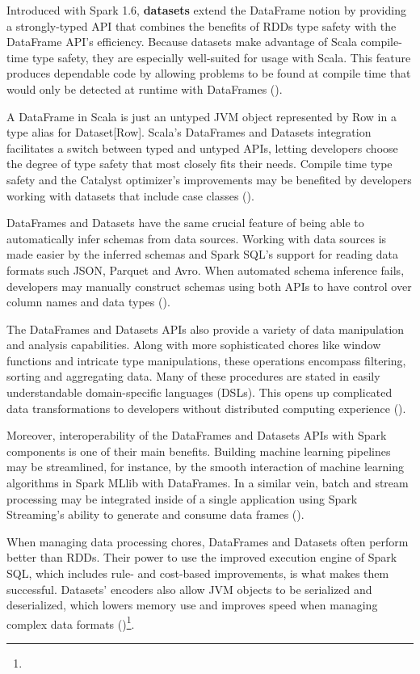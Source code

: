 Introduced with Spark 1.6, \textbf{datasets} extend the DataFrame notion by providing a strongly-typed API that combines the benefits of RDDs type safety with the DataFrame API's efficiency. Because datasets make advantage of Scala compile-time type safety, they are especially well-suited for usage with Scala. This feature produces dependable code by allowing problems to be found at compile time that would only be detected at runtime with DataFrames (\cite{Chambers2018SparkTD})\footnotemark[35].

A DataFrame in Scala is just an untyped JVM object represented by Row in a type alias for Dataset[Row]. Scala's DataFrames and Datasets integration facilitates a switch between typed and untyped APIs, letting developers choose the degree of type safety that most closely fits their needs. Compile time type safety and the Catalyst optimizer's improvements may be benefited by developers working with datasets that include case classes (\cite{Chambers2018SparkTD})\footnotemark[35].

DataFrames and Datasets have the same crucial feature of being able to automatically infer schemas from data sources. Working with data sources is made easier by the inferred schemas and Spark SQL's support for reading data formats such JSON, Parquet and Avro. When automated schema inference fails, developers may manually construct schemas using both APIs to have control over column names and data types (\cite{Chambers2018SparkTD})\footnotemark[35].

The DataFrames and Datasets APIs also provide a variety of data manipulation and analysis capabilities. Along with more sophisticated chores like window functions and intricate type manipulations, these operations encompass filtering, sorting and aggregating data. Many of these procedures are stated in easily understandable domain-specific languages (DSLs). This opens up complicated data transformations to developers without distributed computing experience (\cite{Chambers2018SparkTD})\footnotemark[35].

Moreover, interoperability of the DataFrames and Datasets APIs with Spark components is one of their main benefits. Building machine learning pipelines may be streamlined, for instance, by the smooth interaction of machine learning algorithms in Spark MLlib with DataFrames. In a similar vein, batch and stream processing may be integrated inside of a single application using Spark Streaming's ability to generate and consume data frames (\cite{Chambers2018SparkTD})\footnotemark[35].


When managing data processing chores, DataFrames and Datasets often perform better than RDDs. Their power to use the improved execution engine of Spark SQL, which includes rule- and cost-based improvements, is what makes them successful. Datasets' encoders also allow JVM objects to be serialized and deserialized, which lowers memory use and improves speed when managing complex data formats (\cite{Chambers2018SparkTD})\footnote[35]{}.